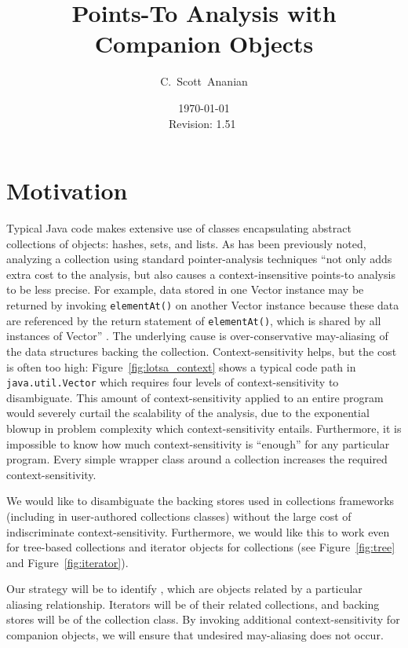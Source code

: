 \documentclass[11pt,notitlepage]{article}
\author{C.~Scott~Ananian}
\title{Points-To Analysis with Companion Objects}
\date{\today \\ $ $Revision: 1.51 $ $}
\begin{document}

\maketitle
\section{Motivation}
Typical Java code makes extensive use of classes encapsulating abstract
collections of objects: hashes, sets, and lists.  As has been
previously noted, analyzing a collection using standard pointer-analysis
techniques ``not only adds extra cost to the analysis, but also causes
a context-insensitive points-to analysis to be less precise.  For
example, data stored in one Vector instance may be returned by
invoking \texttt{elementAt()} on another Vector instance because these
data are referenced by the return statement of \texttt{elementAt()},
which is shared by all instances of Vector'' \cite[p. 75]{379676}.
The underlying cause is over-conservative may-aliasing of the data
structures backing the collection.  Context-sensitivity helps, but the
cost is often too high: Figure~\ref{fig:lotsa_context} shows a typical
code path in \texttt{java.util.Vector} which requires four levels of
context-sensitivity to disambiguate.  This amount of
context-sensitivity applied to an entire program would severely
curtail the scalability of the analysis, due to the exponential blowup
in problem complexity which context-sensitivity entails.  Furthermore,
it is impossible to know how much context-sensitivity is ``enough''
for any particular program.  Every simple wrapper class around a
collection increases the required context-sensitivity.

We would like to disambiguate the backing stores used in collections
frameworks (including in user-authored collections classes) without
the large cost of indiscriminate context-sensitivity.  Furthermore, we
would like this to work even for tree-based collections and iterator
objects for collections (see Figure~\ref{fig:tree} and
Figure~\ref{fig:iterator}).

Our strategy will be to identify , which
are objects related by a particular aliasing relationship.  Iterators
will be  of their related collections, and
backing stores will be  of the collection
class.  By invoking additional context-sensitivity for companion
objects, we will ensure that undesired may-aliasing does not occur.
\end{document}
